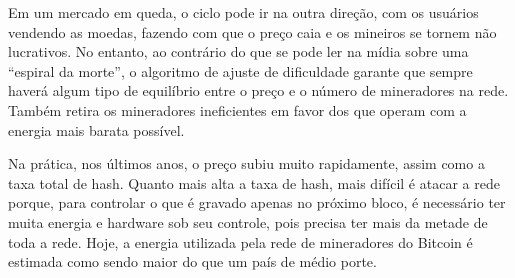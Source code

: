 Em um mercado em queda, o ciclo pode ir na outra direção, com os usuários vendendo as moedas, fazendo com que o preço caia e os mineiros se tornem não lucrativos. No entanto, ao contrário do que se pode ler na mídia sobre uma “espiral da morte”, o algoritmo de ajuste de dificuldade garante que sempre haverá algum tipo de equilíbrio entre o preço e o número de mineradores na rede. Também retira os mineradores ineficientes em favor dos que operam com a energia mais barata possível.

Na prática, nos últimos anos, o preço subiu muito rapidamente, assim como a taxa total de hash. Quanto mais alta a taxa de hash, mais difícil é atacar a rede porque, para controlar o que é gravado apenas no próximo bloco, é necessário ter muita energia e hardware sob seu controle, pois precisa ter mais da metade de toda a rede. Hoje, a energia utilizada pela rede de mineradores do Bitcoin é estimada como sendo maior do que um país de médio porte.